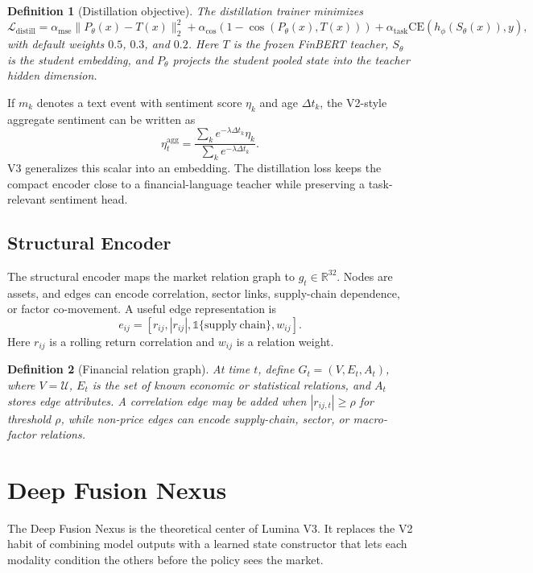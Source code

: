 \documentclass[10pt]{article}
\newtheorem{definition}{Definition}[section]
\newcommand{\R}{\mathbb{R}}
\newcommand{\ind}{\mathbb{1}}
\begin{document}
\begin{definition}[Distillation objective]
	The distillation trainer minimizes
	\[
		\mathcal{L}_{\mathrm{distill}}
		=
		\alpha_{\mathrm{mse}}\|P_\theta(x)-T(x)\|_2^2
		+
		\alpha_{\mathrm{cos}}\left(1-\cos(P_\theta(x),T(x))\right)
		+
		\alpha_{\mathrm{task}}\mathrm{CE}(h_\phi(S_\theta(x)),y),
	\]
	with default weights \(0.5\), \(0.3\), and \(0.2\). Here \(T\) is the frozen FinBERT teacher,
	\(S_\theta\) is the student embedding, and \(P_\theta\) projects the student pooled state into
	the teacher hidden dimension.
\end{definition}

If \(m_k\) denotes a text event with sentiment score \(\eta_k\) and age \(\Delta t_k\), the
V2-style aggregate sentiment can be written as
\[
	\eta_t^{\mathrm{agg}}
	=
	\frac{\sum_k e^{-\lambda\Delta t_k}\eta_k}
	{\sum_k e^{-\lambda\Delta t_k}}.
\]
V3 generalizes this scalar into an embedding. The distillation loss keeps the compact encoder
close to a financial-language teacher while preserving a task-relevant sentiment head.

\subsection{Structural Encoder}

The structural encoder maps the market relation graph to \(g_t\in\R^{32}\). Nodes are
assets, and edges can encode correlation, sector links, supply-chain dependence, or factor
co-movement. A useful edge representation is
\[
	e_{ij}=[r_{ij}, |r_{ij}|, \ind\{\mathrm{supply\ chain}\}, w_{ij}].
\]
Here \(r_{ij}\) is a rolling return correlation and \(w_{ij}\) is a relation weight.

\begin{definition}[Financial relation graph]
	At time \(t\), define \(G_t=(V,E_t,A_t)\), where \(V=\mathcal{U}\), \(E_t\) is the set of
	known economic or statistical relations, and \(A_t\) stores edge attributes. A correlation
	edge may be added when \(|r_{ij,t}|\ge \rho\) for threshold \(\rho\), while non-price edges
	can encode supply-chain, sector, or macro-factor relations.
\end{definition}

\section{Deep Fusion Nexus}

The Deep Fusion Nexus is the theoretical center of Lumina V3. It replaces the V2 habit of
combining model outputs with a learned state constructor that lets each modality condition the
others before the policy sees the market.
\end{document}
